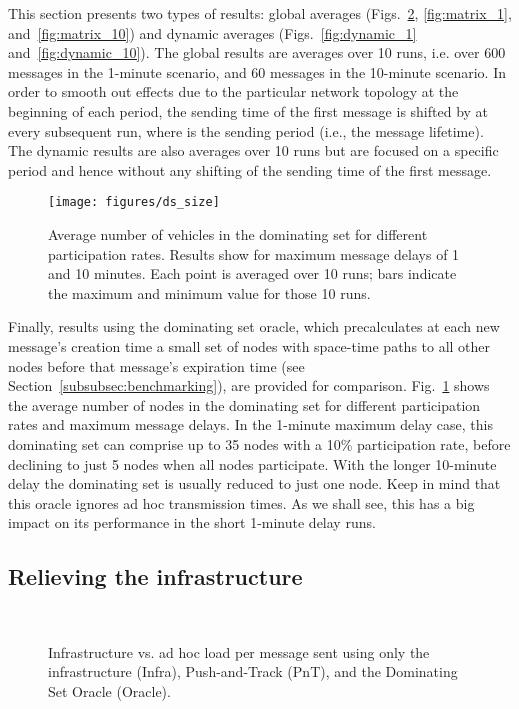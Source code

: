 \documentclass[preprint]{elsarticle}
\begin{document}
This section presents two types of results: global averages (Figs.~\ref{fig:infra_relief}, \ref{fig:matrix_1}, and~\ref{fig:matrix_10}) and dynamic averages (Figs.~\ref{fig:dynamic_1} and~\ref{fig:dynamic_10}). The global results are averages over 10 runs, i.e. over 600 messages in the 1-minute scenario, and 60 messages in the 10-minute scenario. In order to smooth out effects due to the particular network topology at the beginning of each period, the sending time of the first message is shifted by  at every subsequent run, where  is the sending period (i.e., the message lifetime). The dynamic results are also averages over 10 runs but are focused on a specific period and hence without any shifting of the sending time of the first message.

\begin{figure}[t]
  \centering
  \texttt{[image: figures/ds\_size]}
  \caption{Average number of vehicles in the dominating set for different participation rates. Results show for maximum message delays of 1 and 10 minutes. Each point is averaged over 10 runs; bars indicate the maximum and minimum value for those 10 runs.}
  \label{fig:ds_size}
\end{figure}

Finally, results using the dominating set oracle, which precalculates at each new message's creation time a small set of nodes with space-time paths to all other nodes before that message's expiration time (see Section~\ref{subsubsec:benchmarking}), are provided for comparison. Fig.~\ref{fig:ds_size} shows the average number of nodes in the dominating set for different participation rates and maximum message delays. In the 1-minute maximum delay case, this dominating set can comprise up to 35 nodes with a 10\% participation rate, before declining to just 5 nodes when all nodes participate. With the longer 10-minute delay the dominating set is usually reduced to just one node. Keep in mind that this oracle ignores ad hoc transmission times. As we shall see, this has a big impact on its performance in the short 1-minute delay runs.

\subsection{Relieving the infrastructure}
\label{subsec:relief}

\begin{figure}[t]
  \centering
   \\
  \caption{Infrastructure vs. ad hoc load per message sent using only the infrastructure (Infra), Push-and-Track (PnT), and the Dominating Set Oracle (Oracle).}
  \label{fig:infra_relief}
\end{figure}
\end{document}
